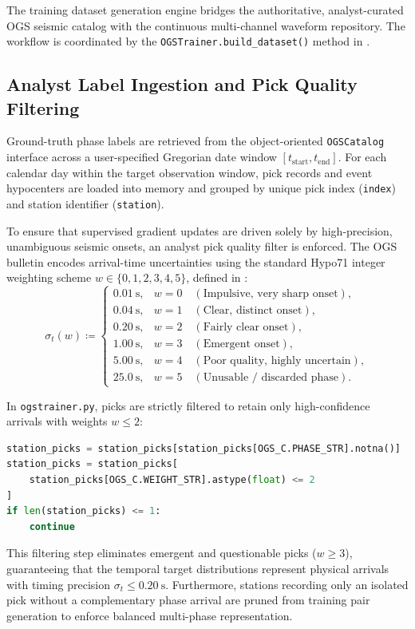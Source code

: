 The training dataset generation engine bridges the authoritative,
analyst-curated \ac{OGS} seismic catalog with the continuous multi-channel
waveform repository. The
workflow is coordinated by the \texttt{OGSTrainer.build\_dataset()} method in
.

\subsection{Analyst Label Ingestion and Pick Quality Filtering}
\label{subsec:pick_filtering}

Ground-truth phase labels are retrieved from the object-oriented
\texttt{OGSCatalog} interface across a user-specified Gregorian date window
$[t_{\mathrm{start}}, t_{\mathrm{end}}]$. For each calendar day within the
target observation window, pick records and event hypocenters are loaded into
memory and grouped by unique pick index (\texttt{index}) and station
identifier (\texttt{station}).

To ensure that supervised gradient updates are driven solely by high-precision,
unambiguous seismic onsets, an analyst pick quality filter is enforced. The
\ac{OGS} bulletin encodes arrival-time uncertainties using the standard Hypo71
\parencite{Hypo71} integer weighting scheme $w \in \{0, 1, 2, 3, 4,
5\}$, defined
in :
\begin{equation}
  \sigma_t(w) \coloneqq
  \begin{cases}
    \qty{0.01}{\second}, & w = 0 \quad (\text{Impulsive, very sharp
    onset}), \\
    \qty{0.04}{\second}, & w = 1 \quad (\text{Clear, distinct onset}), \\
    \qty{0.20}{\second}, & w = 2 \quad (\text{Fairly clear onset}), \\
    \qty{1.00}{\second}, & w = 3 \quad (\text{Emergent onset}), \\
    \qty{5.00}{\second}, & w = 4 \quad (\text{Poor quality, highly
    uncertain}), \\
    \qty{25.0}{\second}, & w = 5 \quad (\text{Unusable / discarded phase}).
  \end{cases}
  \label{eq:hypo71_weights}
\end{equation}

In \texttt{ogstrainer.py}, picks are strictly filtered to retain
only high-confidence
arrivals with weights $w \le 2$:
\begin{lstlisting}[language=python,basicstyle=\scriptsize\ttfamily]
station_picks = station_picks[station_picks[OGS_C.PHASE_STR].notna()]
station_picks = station_picks[
    station_picks[OGS_C.WEIGHT_STR].astype(float) <= 2
]
if len(station_picks) <= 1:
    continue
\end{lstlisting}
This filtering step eliminates emergent and questionable picks ($w \ge 3$),
guaranteeing that the temporal target distributions represent physical arrivals
with timing precision $\sigma_t \le \qty{0.20}{\second}$.
Furthermore, stations
recording only an isolated pick without a complementary phase arrival are
pruned from training pair generation to enforce balanced multi-phase
representation.

